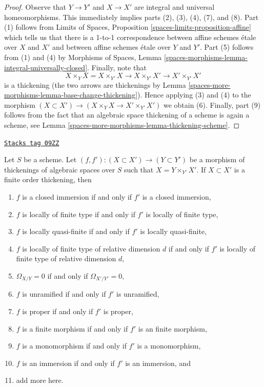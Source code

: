\begin{proof}
Observe that $Y \to Y'$ and $X \to X'$ are integral and
universal homeomorphisms. This immediately implies parts
(2), (3), (4), (7), and (8).
Part (1) follows from
Limits of Spaces, Proposition \ref{spaces-limits-proposition-affine}
which tells us that there is a 1-to-1 correspondence between
affine schemes \'etale over $X$ and $X'$ and between affine schemes
\'etale over $Y$ and $Y'$.
Part (5) follows from (1) and (4) by
Morphisms of Spaces, Lemma
\ref{spaces-morphisms-lemma-integral-universally-closed}.
Finally, note that
$$
X \times_Y X = X \times_{Y'} X \to X \times_{Y'} X' \to X' \times_{Y'} X'
$$
is a thickening (the two arrows are thickenings by
Lemma \ref{spaces-more-morphisms-lemma-base-change-thickening}).
Hence applying (3) and (4) to the morphism
$(X \subset X') \to (X \times_Y X \to X' \times_{Y'} X')$
we obtain (6). Finally, part (9) follows from the fact that an
algebraic space thickening of a scheme is again a scheme, see
Lemma \ref{spaces-more-morphisms-lemma-thickening-scheme}.
\end{proof}

\begin{lemma}
\label{spaces-more-morphisms-lemma-thicken-property-morphisms-cartesian}
\href{https://stacks.math.columbia.edu/tag/09ZZ}{\texttt{Stacks tag 09ZZ}}

Let $S$ be a scheme. Let $(f, f') : (X \subset X') \to (Y \subset Y')$ be a
morphism of thickenings of algebraic spaces over $S$ such that
$X = Y \times_{Y'} X'$. If $X \subset X'$ is a finite order thickening, then
\begin{enumerate}
\item $f$ is a closed immersion if and only if $f'$ is a closed immersion,
\item $f$ is locally of finite type if and only if $f'$ is
locally of finite type,
\item $f$ is locally quasi-finite if and only if $f'$ is locally
quasi-finite,
\item $f$ is locally of finite type of relative dimension $d$ if and
only if $f'$ is locally of finite type of relative dimension $d$,
\item $\Omega_{X/Y} = 0$ if and only if $\Omega_{X'/Y'} = 0$,
\item $f$ is unramified if and only if $f'$ is unramified,
\item $f$ is proper if and only if $f'$ is proper,
\item $f$ is a finite morphism if and only if $f'$ is an finite morphism,
\item $f$ is a monomorphism if and only if $f'$ is a monomorphism,
\item $f$ is an immersion if and only if $f'$ is an immersion, and
\item add more here.
\end{enumerate}
\end{lemma}

